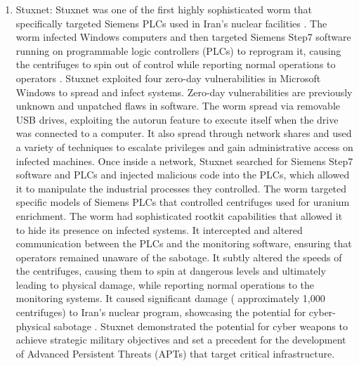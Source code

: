 \begin{enumerate}
    \item Stuxnet: Stuxnet was one of the first highly sophisticated worm that specifically targeted Siemens PLCs used in Iran's nuclear facilities \cite{Langner}. The worm infected Windows computers and then targeted Siemens Step7 software running on programmable logic controllers (PLCs) to reprogram it, causing the centrifuges to spin out of control while reporting normal operations to operators \cite{kushner2013real}. Stuxnet exploited four zero-day vulnerabilities in Microsoft Windows to spread and infect systems. Zero-day vulnerabilities are previously unknown and unpatched flaws in software. The worm spread via removable USB drives, exploiting the autorun feature to execute itself when the drive was connected to a computer. It also spread through network shares and used a variety of techniques to escalate privileges and gain administrative access on infected machines. Once inside a network, Stuxnet searched for Siemens Step7 software and PLCs and injected malicious code into the PLCs, which allowed it to manipulate the industrial processes they controlled. The worm targeted specific models of Siemens PLCs that controlled centrifuges used for uranium enrichment. The worm had sophisticated rootkit capabilities that allowed it to hide its presence on infected systems\cite{farwell2011stuxnet}. It intercepted and altered communication between the PLCs and the monitoring software, ensuring that operators remained unaware of the sabotage. It subtly altered the speeds of the centrifuges, causing them to spin at dangerous levels and ultimately leading to physical damage, while reporting normal operations to the monitoring systems. It caused significant damage ( approximately 1,000 centrifuges) to Iran’s nuclear program, showcasing the potential for cyber-physical sabotage \cite{CCDCOE}. Stuxnet demonstrated the potential for cyber weapons to achieve strategic military objectives and  set a precedent for the development of Advanced Persistent Threats (APTs) \cite{stojanovic2020apt} that target critical infrastructure. 

\end{enumerate}
